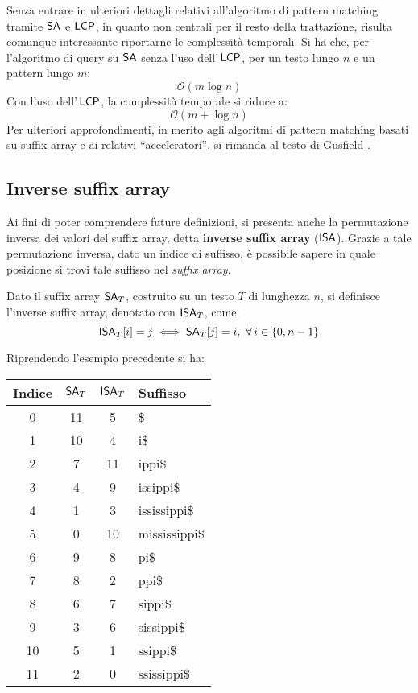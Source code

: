 Senza entrare in ulteriori dettagli relativi all'algoritmo di pattern matching
tramite $\mbox{\rm {\sf SA}}$ e $\mbox{\rm {\sf LCP}}$, in quanto non centrali per il resto della
trattazione, risulta comunque interessante riportarne le complessità
temporali. Si ha che, per l'algoritmo di query su $\mbox{\rm {\sf SA}}$ senza l'uso
dell'$\,\mbox{\rm {\sf LCP}}$, per un testo lungo $n$ e un pattern lungo $m$:
\begin{equation}
  \label{eq:satime}
  \mathcal{O}(m\log n)
\end{equation}
Con l'uso dell'$\,\mbox{\rm {\sf LCP}}$, la complessità temporale si riduce a:
\begin{equation}
  \label{eq:salcptime}
  \mathcal{O}(m+\log n)
\end{equation}
Per ulteriori approfondimenti, in merito agli algoritmi di pattern matching
basati su suffix array e ai relativi ``acceleratori'', si rimanda
al testo di Gusfield \cite{gusfield1997}.
\subsection{Inverse suffix array}
Ai fini di poter comprendere future definizioni, si presenta anche la
permutazione inversa dei valori del suffix array, detta
\textbf{inverse suffix array} ($\mbox{\rm {\sf ISA}}$). Grazie a tale permutazione
inversa, dato un indice di suffisso, è possibile sapere in quale posizione si
trovi tale suffisso nel \textit{suffix array}.  
\begin{definizione}
  Dato il suffix array $\mbox{\rm {\sf SA}}_T$, costruito su un testo $T$ di lunghezza
  $n$, si definisce l'inverse suffix array, denotato con $\mbox{\rm {\sf ISA}}_T$, come:
  \begin{equation}
    \label{eq:isadef}
    \mbox{\rm {\sf ISA}}_T[i]=j\iff \mbox{\rm {\sf SA}}_T[j]=i,\,\,\forall\, i\in\{0,n-1\}
  \end{equation}
\end{definizione}

\begin{esempio}
  Riprendendo l'esempio precedente si ha:
  \begin{table}[H]
    \centering
    \footnotesize
    \begin{tabular}{c|c|c|l} 
      \textbf{Indice} & $\mbox{\rm {\sf SA}}_T$ & $\mbox{\rm {\sf ISA}}_T$ & \textbf{Suffisso}\\ 
      \hline
      0 & 11 & 5 & \$\\
      1 & 10 & 4 & i\$\\
      2 & 7 & 11 & ippi\$\\
      3 & 4 & 9 & issippi\$\\
      4 & 1 & 3 & ississippi\$\\
      5 & 0 & 10 & mississippi\$\\
      6 & 9 & 8 & pi\$\\
      7 & 8 & 2 & ppi\$\\
      8 & 6 & 7 & sippi\$\\
      9 & 3 & 6 & sissippi\$\\
      10 & 5 & 1 & ssippi\$\\
      11 & 2 & 0 & ssissippi\$\\
    \end{tabular}
  \end{table}
\end{esempio}

